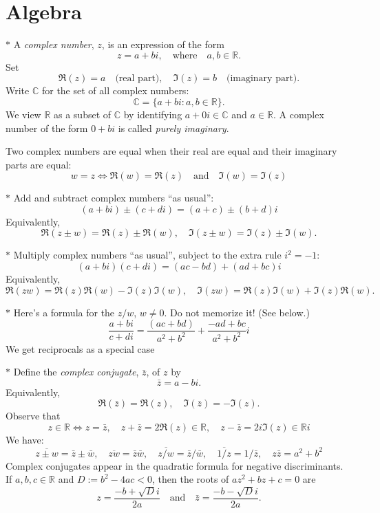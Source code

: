 \documentclass[12pt]{amsart}
\newcommand{\CC}{\mathbb{C}}
\newcommand{\RR}{\mathbb{R}}
\begin{document}
\setlength\parindent{0em}
\setlength\parskip{2em}
\renewcommand{\baselinestretch}{1.5}

\section{Algebra}

$*$ A \emph{complex number}, $z$, is an expression of the form
\[
    z=a+bi,\quad \text{where}\quad a,b\in\RR.
\]
Set
\[
\Re(z)=a \quad\text{(real part)},\quad
\Im(z)=b  \quad\text{(imaginary part)}.
\]
Write $\CC$ for the set of all complex numbers:
\[
    \CC = \{a+bi : a,b\in \RR\}.
\]
We view $\RR$ as a subset of $\CC$ by identifying $a+0i\in\CC$ and $a\in\RR$.
A complex number of the form $0+bi$ is called \emph{purely imaginary}.


Two complex numbers are equal when their real are equal and their imaginary parts are equal:
\[
    w = z \Longleftrightarrow \Re(w)=\Re(z)\quad\text{and}\quad \Im(w)=\Im(z)
\]




$*$ Add and subtract complex numbers ``as usual'':
\[
    (a+ bi) \pm (c + di) = (a+c)\pm (b+d)i
\]
Equivalently,
\[
    \Re(z\pm w) = \Re(z) \pm \Re(w),\quad \Im(z\pm w)=\Im(z) \pm \Im(w).
\]

$*$ Multiply complex numbers ``as usual'', subject to the extra rule $i^2=-1$:
\[
    (a+ bi) (c + di) = (ac - bd) + (ad + bc)i
\]
Equivalently,
\[
    \Re(zw) = \Re(z)\Re(w) - \Im(z)\Im(w),\quad
    \Im(zw) = \Re(z)\Im(w) + \Im(z)\Re(w).
\]

$*$ Here's a formula for the $z/w$, $w\neq 0$. Do not memorize it! (See below.)
\[
        \frac{a+ bi}{c + di} = \frac{(ac + bd)}{a^2+b^2} + \frac{-ad + bc}{a^2+b^2}i
\]
We get reciprocals as a special case

$*$ Define the \emph{complex conjugate}, $\bar z$, of $z$ by
\[
    \bar z = a - bi.
\]
Equivalently,
\[
    \Re(\bar z) = \Re(z),\quad \Im(\bar z) = -\Im(z).
\]
Observe that
\[
    z\in\RR \Longleftrightarrow z=\bar z,\quad z+\bar z=2\Re(z)\in\RR,\quad z-\bar z=2i\Im(z)\in\RR i
\]
We have:
\[
    \overline{z \pm w} = \bar z\pm \bar w,\quad
    \overline{zw} = \bar z\bar w,\quad
    \overline{z/w} = \bar z/\bar w,\quad
    \overline{1/z} = 1/\bar z,\quad
    z\bar z = a^2+b^2
\]
Complex conjugates appear in the quadratic formula for negative discriminants.
If $a,b,c\in\RR$ and $D := b^2-4ac <0$, then the roots of $az^2 + bz + c=0$ are
\[
    z=\frac{-b + \sqrt{D}i}{2a}\quad\text{and}\quad \bar z =\frac{-b-\sqrt Di}{2a}.
\]
\end{document}
